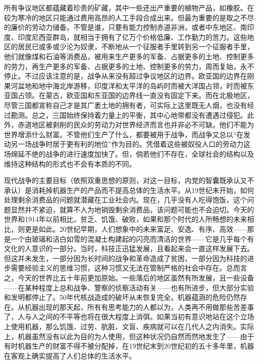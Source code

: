 所有争议地区都蕴藏着珍贵的矿藏，其中一些还出产重要的植物产品，如橡胶。在较为寒冷的地区只能通过费用高昂的人工手段合成出来。但最为重要的是取之不尽的廉价的劳动力储备。不管是谁，只要有能力控制赤道非洲，或者中东地区、南印度、印度尼西亚群岛，就相当于拥有了亿万个价格低廉、工作勤力的苦力。这些地区的居民已或多或少沦为奴隶，不断地从一个征服者手里转到另一个征服者手里，他们就像煤和石油等消费品，被用来生产更多的军备、占据更多的土地、控制更多的劳力，再生产更多的军备、占据更多的土地、控制更多的劳力，周而复始，永不停止。不过应该注意的是，战争从来没有超过争议地区的边界。欧亚国的边界在刚果河盆地和地中海北岸游移，印度洋和太平洋的岛屿时而被大洋国占领，时而被东亚国占领。在蒙古，欧亚国和东亚国的边界线一直没有固定下来。而在北极地区，尽管三国都宣称自己才是其广袤土地的拥有者，可实际上这里既无人烟，也没有经过勘测。总之，三国始终保持着力量上的平衡，其中心地带都没有遭遇过侵犯。此外，赤道地区被剥削的民众的劳动力对世界经济而言也并非必不可缺。他们不能为世界增添什么财富。不管他们生产了什么，都要被用于战争，而战争又总以``在发动另一场战争时居于更有利的地位''作为目的。凭借着这些被奴役人口的劳动力这场绵延不绝的战争的进行速度加快了。但，倘若他们不存在，全球社会的结构以及维持这种结构的形式也不会有本质的不同。

现代战争的主要目标（依照双重思想的原则，对这一目标，内党的智囊既承认又不承认）是消耗掉机器生产的产品而不提高总体的生活水平。从19世纪末开始，如何处理剩余消费品的问题就潜藏在工业社会内。现在，几乎没有人吃得饱饭，这个问题显然并不紧迫，就算不人为地销毁剩余消费品，该问题可能也不会迫切。今天的世界和1914年以前相比，贫乏、饥饿、破败，如果和那个时代的人所畅想的未来相比，则更是如此。20世纪早期，人们想象中的未来富足、安逸、有序、高效------那是一个由玻璃和洁白如雪的混凝土构建起的闪亮而清洁的世界------它是几乎每个有文化的人意识的一部分。当时，科技正迅猛发展，且看起来会一直这样发展下去。但这并未发生，一部分因为长时间的战争和革命造成了贫困，一部分因为科技的进步需要经验主义的思维习惯，这种习惯又无法在管制严格的社会中存在。总而言之，今天的世界比五十年前更加原始。一些落后的地区虽然有所发展，且一些设备------在某种程度上总和战争、警察的侦察活动有关------也有所进步，但大部分实验和发明都停止了。50年代核战造成的破坏从未恢复完全。机器蕴涵的危险仍然存在。从机器出现的那天起，所有有思考能力的人都以为，人类再不用做那些苦差事了，人与人之间的不平等也将在很大程度上消弭。如果当初有意识地站在这个立场上使用机器，那么饥饿、过劳、肮脏、文盲、疾病就可以在几代人之内消失。实际上，机器虽然没有以此为目的为人使用，但这种状况仍自然而然地发生了------由于有时机器生产的财富不得不被分配掉，在19世纪末到20世纪初的五十多年里，机器在客观上确实提高了人们总体的生活水平。

